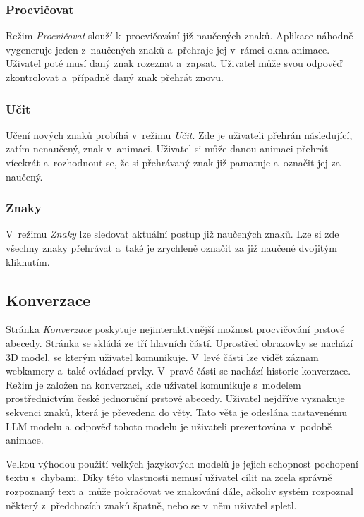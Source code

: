 \documentclass[
  master,
  program=ainfvs,
  biblatex,
  figures=true,
  tables=false,
  sourcecodes=true,
  glossaries,
  index
]{kidiplom}
\begin{document}
        \subsubsection{Procvičovat}
            Režim \emph{Procvičovat} slouží k~procvičování již naučených znaků. Aplikace náhodně vygeneruje jeden z~naučených znaků a~přehraje jej v~rámci okna animace. Uživatel poté musí daný znak rozeznat a~zapsat. Uživatel může svou odpověď zkontrolovat a~případně daný znak přehrát znovu.

        \subsubsection{Učit}
            Učení nových znaků probíhá v~režimu \emph{Učit}. Zde je uživateli přehrán následující, zatím nenaučený, znak v~animaci. Uživatel si může danou animaci přehrát vícekrát a~rozhodnout se, že si přehrávaný znak již pamatuje a~označit jej za naučený.

        \subsubsection{Znaky}
            V~režimu \emph{Znaky} lze sledovat aktuální postup již naučených znaků. Lze si zde všechny znaky přehrávat a~také je zrychleně označit za již naučené dvojitým kliknutím.

    \subsection{Konverzace} \label{up-konverzace}
        Stránka \emph{Konverzace} poskytuje nejinteraktivnější možnost procvičování prstové abecedy. Stránka se skládá ze tří hlavních částí. Uprostřed obrazovky se nachází 3D model, se kterým uživatel komunikuje. V~levé části lze vidět záznam webkamery a~také ovládací prvky. V~pravé části se nachází historie konverzace. Režim je založen na konverzaci, kde uživatel komunikuje s~modelem prostřednictvím české jednoruční prstové abecedy. Uživatel nejdříve vyznakuje sekvenci znaků, která je převedena do věty. Tato věta je odeslána nastavenému LLM modelu a~odpověď tohoto modelu je uživateli prezentována v~podobě animace.


        Velkou výhodou použití velkých jazykových modelů je jejich schopnost pochopení textu s~chybami. Díky této vlastnosti nemusí uživatel cílit na zcela správně rozpoznaný text a~může pokračovat ve znakování dále, ačkoliv systém rozpoznal některý z~předchozích znaků špatně, nebo se v~něm uživatel spletl.
\end{document}

